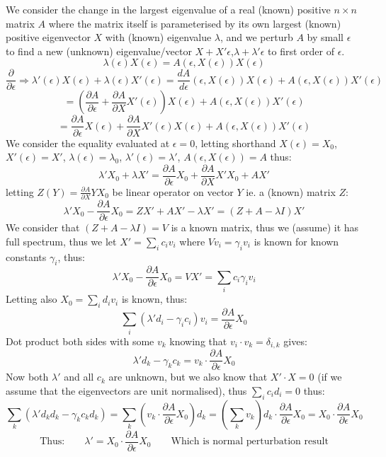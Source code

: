 \documentclass{article}
\begin{document}
We consider the change in the largest eigenvalue of a real (known) positive $n\times n$ matrix $A$ where the matrix itself is parameterised by its own largest (known) positive eigenvector $X$ with (known) eigenvalue $\lambda$, and we perturb $A$ by small $\epsilon$ to find a new (unknown) eigenvalue/vector $X+X'\epsilon$,$\lambda+\lambda'\epsilon$ to first order of $\epsilon$. 
$$ \lambda(\epsilon)X(\epsilon) = A(\epsilon,X(\epsilon))X(\epsilon) $$
$$ \frac{\partial}{\partial \epsilon}\Rightarrow \lambda'(\epsilon)X(\epsilon)+\lambda(\epsilon)X'(\epsilon) = \frac{d A}{d \epsilon}(\epsilon,X(\epsilon))X(\epsilon)+A(\epsilon,X(\epsilon))X'(\epsilon)$$
$$ =\left(\frac{\partial A}{\partial \epsilon} + \frac{\partial A}{\partial X}X'(\epsilon)\right)X(\epsilon) +A(\epsilon,X(\epsilon))X'(\epsilon) $$
$$ = \frac{\partial A}{\partial \epsilon}X(\epsilon) + \frac{\partial A}{\partial X}X'(\epsilon)X(\epsilon) +A(\epsilon,X(\epsilon))X'(\epsilon) $$
We consider the equality evaluated at $\epsilon=0$, letting shorthand $X(\epsilon)=X_0$, $X'(\epsilon)=X'$, $\lambda(\epsilon)=\lambda_0$, $\lambda'(\epsilon)=\lambda'$, $A(\epsilon,X(\epsilon)) = A$ thus:
$$\lambda'X_0+\lambda X' = \frac{\partial A}{\partial \epsilon}X_0 + \frac{\partial A}{\partial X}X'X_0 +AX' $$
letting $Z(Y)=\frac{\partial A}{\partial X}YX_0$ be linear operator on vector $Y$ ie. a (known) matrix $Z$:
$$\lambda'X_0 - \frac{\partial A}{\partial \epsilon}X_0 =  ZX' +AX'-\lambda X'  = (Z+A-\lambda I)X'$$
We consider that $(Z+A-\lambda I)=V$ is a known matrix, thus we (assume) it has full spectrum, thus we let $X'=\sum_ic_iv_i$ where $Vv_i=\gamma_iv_i$ is known for known constants $\gamma_i$, thus:
$$\lambda'X_0 - \frac{\partial A}{\partial \epsilon}X_0 = VX' = \sum_ic_i\gamma_iv_i$$
Letting also $X_0=\sum_id_iv_i$ is known, thus:
$$\sum_i\left(\lambda'd_i - \gamma_ic_i \right)v_i = \frac{\partial A}{\partial \epsilon}X_0 $$
Dot product both sides with some $v_k$ knowing that $v_i\cdot v_k = \delta_{i,k}$ gives:
$$\lambda'd_k - \gamma_kc_k = v_k\cdot\frac{\partial A}{\partial \epsilon}X_0 $$
Now both $\lambda'$ and all $c_k$ are unknown, but we also know that $X'\cdot X=0$ (if we assume that the eigenvectors are unit normalised), thus $\sum_ic_id_i=0$ thus:
$$\sum_k\left(\lambda'd_kd_k - \gamma_kc_kd_k\right) = \sum_k\left(v_k\cdot\frac{\partial A}{\partial \epsilon}X_0\right)d_k = \left(\sum_kv_k\right)d_k\cdot\frac{\partial A}{\partial \epsilon}X_0 = X_0\cdot \frac{\partial A}{\partial \epsilon}X_0 $$
$$ \text{Thus:}\qquad\boxed{\lambda' = X_0\cdot \frac{\partial A}{\partial \epsilon}X_0} \qquad \text{Which is normal perturbation result}$$
\end{document}
